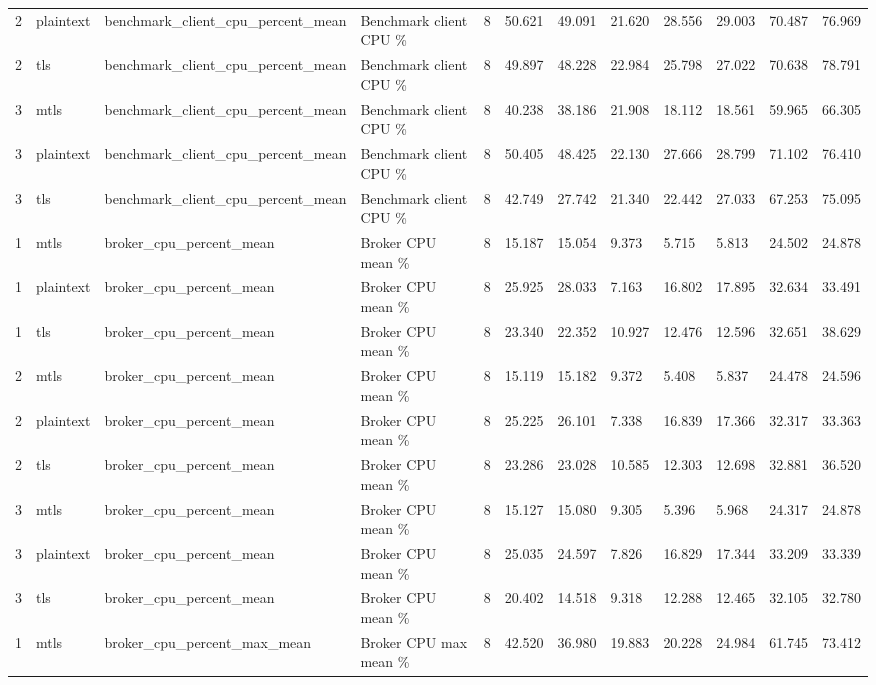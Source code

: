 \begin{longtable}{llllllllllll}
2 & plaintext & benchmark\_client\_cpu\_percent\_mean & Benchmark client CPU \% & 8 & 50.621 & 49.091 & 21.620 & 28.556 & 29.003 & 70.487 & 76.969 \\
2 & tls & benchmark\_client\_cpu\_percent\_mean & Benchmark client CPU \% & 8 & 49.897 & 48.228 & 22.984 & 25.798 & 27.022 & 70.638 & 78.791 \\
3 & mtls & benchmark\_client\_cpu\_percent\_mean & Benchmark client CPU \% & 8 & 40.238 & 38.186 & 21.908 & 18.112 & 18.561 & 59.965 & 66.305 \\
3 & plaintext & benchmark\_client\_cpu\_percent\_mean & Benchmark client CPU \% & 8 & 50.405 & 48.425 & 22.130 & 27.666 & 28.799 & 71.102 & 76.410 \\
3 & tls & benchmark\_client\_cpu\_percent\_mean & Benchmark client CPU \% & 8 & 42.749 & 27.742 & 21.340 & 22.442 & 27.033 & 67.253 & 75.095 \\
1 & mtls & broker\_cpu\_percent\_mean & Broker CPU mean \% & 8 & 15.187 & 15.054 & 9.373 & 5.715 & 5.813 & 24.502 & 24.878 \\
1 & plaintext & broker\_cpu\_percent\_mean & Broker CPU mean \% & 8 & 25.925 & 28.033 & 7.163 & 16.802 & 17.895 & 32.634 & 33.491 \\
1 & tls & broker\_cpu\_percent\_mean & Broker CPU mean \% & 8 & 23.340 & 22.352 & 10.927 & 12.476 & 12.596 & 32.651 & 38.629 \\
2 & mtls & broker\_cpu\_percent\_mean & Broker CPU mean \% & 8 & 15.119 & 15.182 & 9.372 & 5.408 & 5.837 & 24.478 & 24.596 \\
2 & plaintext & broker\_cpu\_percent\_mean & Broker CPU mean \% & 8 & 25.225 & 26.101 & 7.338 & 16.839 & 17.366 & 32.317 & 33.363 \\
2 & tls & broker\_cpu\_percent\_mean & Broker CPU mean \% & 8 & 23.286 & 23.028 & 10.585 & 12.303 & 12.698 & 32.881 & 36.520 \\
3 & mtls & broker\_cpu\_percent\_mean & Broker CPU mean \% & 8 & 15.127 & 15.080 & 9.305 & 5.396 & 5.968 & 24.317 & 24.878 \\
3 & plaintext & broker\_cpu\_percent\_mean & Broker CPU mean \% & 8 & 25.035 & 24.597 & 7.826 & 16.829 & 17.344 & 33.209 & 33.339 \\
3 & tls & broker\_cpu\_percent\_mean & Broker CPU mean \% & 8 & 20.402 & 14.518 & 9.318 & 12.288 & 12.465 & 32.105 & 32.780 \\
1 & mtls & broker\_cpu\_percent\_max\_mean & Broker CPU max mean \% & 8 & 42.520 & 36.980 & 19.883 & 20.228 & 24.984 & 61.745 & 73.412 \\

\end{longtable}
